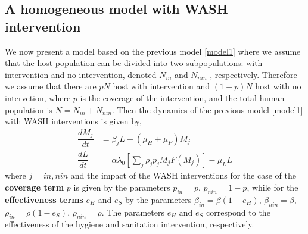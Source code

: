 \documentclass[12pt,a4paper]{article}
\theoremstyle{plain}%
\theoremstyle{definition}
\theoremstyle{remark}
\begin{document}
	\subsection{A homogeneous model with WASH intervention}
	We now present a model based on the previous model \ref{model1} where we assume that the host population  can be divided into two subpopulations: with intervention and no intervention, denoted $N_{in}$  and $N_{nin}$ , respectively.
	Therefore we assume that there are $pN$  host  with intervention and  $(1-p)N$ host with no intervetion, where $p$ is
	the coverage of the intervention, and the total human population is $N = N_{in}  + N_{nin}$.
	Then the dynamics of the previous model \ref{model1} with WASH interventions is given by,
	\begin{equation}\label{model1wash}
	\begin{split}
	\dfrac{dM_j}{dt}&=\beta_j L - (\mu_H+\mu_P) M_j\\%
	\dfrac{dL}{dt}&= \alpha \lambda_0 \left[ \sum_j \rho_j p_j M_j F(M_j)\right]   - \mu_L L 
	\end{split}
	\end{equation} 
	where $j=in,nin$ 
	and the impact of the WASH interventions for the case of the  \textbf{coverage term} $p$ is given by the parameters $p_{in}=p$, $p_{nin}=1-p$, while for the \textbf{effectiveness terms} $e_H$ and $e_S$ by the parameters $\beta_{in}=\beta(1-e_H)$, $\beta_{nin}=\beta$, $\rho_{in}=\rho(1-e_S)$, $\rho_{nin}=\rho$.
	The parameters $e_H$ and $e_S$ correspond to the effectiveness of the hygiene and sanitation intervention, respectively.
	
\end{document}
